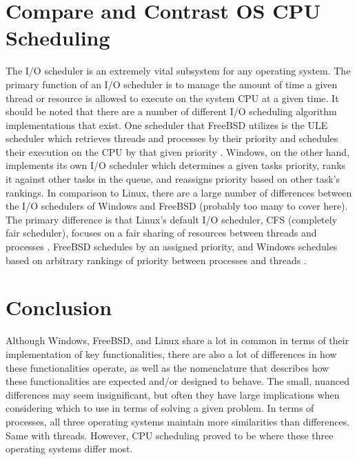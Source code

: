 \documentclass[letterpaper,10pt,draftclsnofoot,onecolumn]{IEEEtran}
\begin{document}
\section{Compare and Contrast OS CPU Scheduling}
The I/O scheduler is an extremely vital subsystem for any operating system. The primary function of an I/O scheduler is to manage the amount of time a given thread or resource is allowed to execute on the system CPU at a given time. It should be noted that there are a number of different I/O scheduling algorithm implementations that exist. One scheduler that FreeBSD utilizes is the ULE scheduler which retrieves threads and processes by their priority and schedules their execution on the CPU by that given priority \cite{FreeBSD1}. Windows, on the other hand, implements its own I/O scheduler which determines a given tasks priority, ranks it against other tasks in the queue, and reassigns priority based on other task’s rankings.
In comparison to Linux, there are a large number of differences between the I/O schedulers of Windows and FreeBSD (probably too many to cover here). The primary difference is that Linux’s default I/O scheduler, CFS (completely fair scheduler), focuses on a fair sharing of resources between threads and processes \cite{Linux}. FreeBSD schedules by an assigned priority, and Windows schedules based on arbitrary rankings of priority between processes and threads \cite{MSWindows1} \cite{FreeBSD1}.\\

\section{Conclusion}
Although Windows, FreeBSD, and Linux share a lot in common in terms of their implementation of key functionalities, there are also a lot of differences in how these functionalities operate, as well as the nomenclature that describes how these functionalities are expected and/or designed to behave. The small, nuanced differences may seem insignificant, but often they have large implications when considering which to use in terms of solving a given problem. In terms of processes, all three operating systems maintain more similarities than differences. Same with threads. However, CPU scheduling proved to be where these three operating systems differ most.

\newpage


\end{document}
